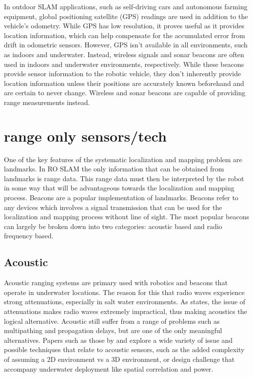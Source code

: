 \documentclass[conference]{IEEEtran}
\begin{document}
	In outdoor SLAM applications, such as self-driving cars and autonomous farming equipment, global positioning satellite (GPS) readings are used in addition to the vehicle's odometry. While GPS has low resolution, it proves useful as it provides location information, which can help compensate for the accumulated error from drift in odometric sensors. However, GPS isn't available in all environments, such as indoors and underwater. Instead, wireless signals and sonar beacons are often used in indoors and underwater environments, respectively. While these beacons provide sensor information to the robotic vehicle, they don't inherently provide location information unless their positions are accurately known beforehand and are certain to never change. Wireless and sonar beacons are capable of providing range measurements instead.
	
	
	\section{range only sensors/tech}
	
	One of the key features of the systematic localization and mapping problem are landmarks. In RO SLAM the only information that can be obtained from landmarks is range data. This range data must then be interpreted by the robot in some way that will be advantageous towards the localization and mapping process. Beacons are a popular implementation of landmarks. Beacons refer to any devices which involves a signal transmission that can be used for the localization and mapping process without line of sight. The most popular beacons can largely be broken down into two categories: acoustic based and radio frequency based.
	
	\subsection{Acoustic}
	
	Acoustic ranging systems are primary used with robotics and beacons that operate in underwater locations. The reason for this that radio waves experience strong attenuations, especially in salt water environments. As \cite{Partan2007} states, the issue of attenuations makes radio waves extremely impractical, thus making acoustics the logical alternative. Acoustic still suffer from a range of problems such as multipathing and propagation delays, but are one of the only meaningful alternatives. Papers such as those by \cite{Erol-Kantarci2011} and \cite{Akyildiz2005} explore a wide variety of issue and possible techniques that relate to acoustic sensors, such as the added complexity of assuming a 2D environment vs a 3D environment, or design challenge that accompany underwater deployment like spatial correlation and power. 
  	
\end{document}
